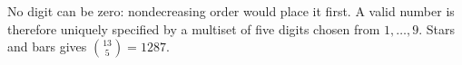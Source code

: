 No digit can be zero: nondecreasing order would place it first. A valid number is therefore uniquely specified by a multiset of five digits chosen from $1,\ldots,9$. Stars and bars gives $\binom{13}{5}=\boxed{1287}$.
